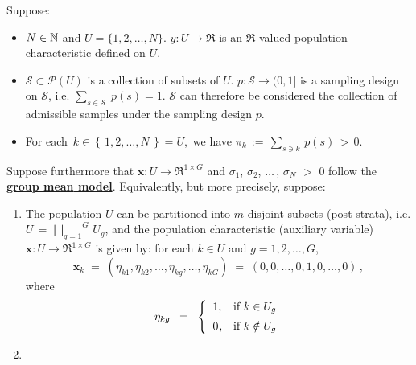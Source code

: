 \begin{corollary}
\mbox{}
\vskip 0.05cm
\noindent
Suppose:
\begin{itemize}
\item
	$N \in \mathbb{N}$ and $U = \{1,2,\ldots,N\}$.
	\vskip 0.05cm
	$y : U \longrightarrow \Re$ is an $\Re$-valued population characteristic defined on $U$.
\item
	$\mathcal{S} \subset \mathcal{P}(U)$ is a collection of subsets of $U$.
	$p : \mathcal{S} \longrightarrow (0,1]$ is a sampling design on $\mathcal{S}$,
	i.e. $\underset{s\in\mathcal{S}}{\sum}\;p(s) = 1$.
	\vskip 0.05cm
	$\mathcal{S}$ can therefore be considered the collection of admissible samples under the sampling design $p$.
\item
	For each \,$k \in \left\{\,1,2,\ldots,N\,\right\} = U$,\, we have
	$\pi_{k} \,:=\, \underset{s \ni k}{\sum}\,p(s) \,>\, 0$.
\end{itemize}
Suppose furthermore that
$\mathbf{x} : U \longrightarrow \Re^{1 \times G}$ and
$\sigma_{1}$, $\sigma_{2}$, $\ldots$\,, $\sigma_{N}$ $>$ $0$
follow the \,\underline{\textbf{{\color{red}group mean} model}}.
\renewcommand{\theenumi}{\alph{enumi}}
\renewcommand{\labelenumi}{\textnormal{(\theenumi)}$\;\;$}
\vskip 0.1cm
\noindent
Equivalently, but more precisely, suppose:
\begin{enumerate}
\item \vskip -0.25cm
	The population $U$ can be partitioned into $m$ disjoint subsets (post-strata), i.e.
	$U \,=\, \overset{G}{\underset{g=1}{\bigsqcup}}\, U_{g}$, and
	the population characteristic (auxiliary variable)
	$\mathbf{x} : U \longrightarrow \Re^{1 \times G}$ is given by:
	for each $k \in U$ and $g = 1,2,\ldots,G$,
	\begin{equation*}
	\mathbf{x}_{k}
	\; = \; (\eta_{k1},\eta_{k2},\ldots,\eta_{kg},\ldots,\eta_{kG})
	\; = \; (0,0,\ldots,0,1,0,\ldots,0)\,,
	\end{equation*}
	where
	\begin{equation*}
	\eta_{kg}
	\;\; = \;\;
		\left\{\begin{array}{cl}
		1, & \textnormal{if $k \in U_{g}$}
		\\
		\overset{{\color{white}-}}{0}, & \textnormal{if $k \notin U_{g}$}
		\end{array}\right.
	\end{equation*}
\item

\end{enumerate}
\end{corollary}
